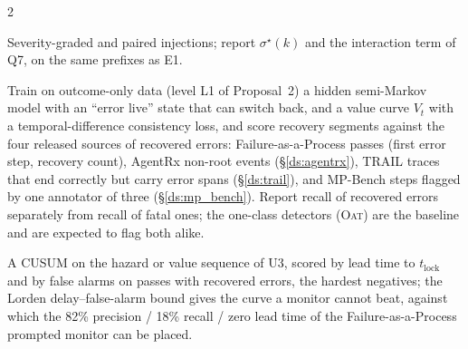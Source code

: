 \begin{multicols}{2}
\begin{description}[leftmargin=1.4em,style=nextline,itemsep=1pt]
\item[E5 --- Dose and interaction.] Severity-graded and paired injections; report $\sigma^\star(k)$ and the interaction term of Q7, on the same prefixes as E1.
\item[E6 --- Recovered-error detection from logs.] Train on outcome-only data (level L1 of Proposal~2) a hidden semi-Markov model \cite{yu2010hsmm} with an ``error live'' state that can switch back, and a value curve $V_t$ with a temporal-difference consistency loss, and score recovery segments against the four released sources of recovered errors: Failure-as-a-Process passes (first error step, recovery count), AgentRx non-root events (\S\ref{ds:agentrx}), TRAIL traces that end correctly but carry error spans (\S\ref{ds:trail}), and MP-Bench steps flagged by one annotator of three (\S\ref{ds:mp_bench}). Report recall of recovered errors separately from recall of fatal ones; the one-class detectors (\textsc{Oat}) are the baseline and are expected to flag both alike.
\item[E7 --- Online monitor with a delay guarantee.] A CUSUM \cite{page1954cusum} on the hazard or value sequence of U3, scored by lead time to $t_{\mathrm{lock}}$ and by false alarms on passes with recovered errors, the hardest negatives; the Lorden delay--false-alarm bound \cite{lorden1971} gives the curve a monitor cannot beat, against which the 82\% precision / 18\% recall / zero lead time of the Failure-as-a-Process prompted monitor can be placed.
\end{description}
\end{multicols}

